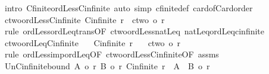 \begin{isabellebody}
\isamarkupfalse%
\ {\isacharparenleft}{\kern0pt}intro\ Cfinite{\isacharunderscore}{\kern0pt}ordLess{\isacharunderscore}{\kern0pt}Cinfinite{\isacharparenright}{\kern0pt}\ {\isacharparenleft}{\kern0pt}auto\ simp{\isacharcolon}{\kern0pt}\ cfinite{\isacharunderscore}{\kern0pt}def\ card{\isacharunderscore}{\kern0pt}of{\isacharunderscore}{\kern0pt}Card{\isacharunderscore}{\kern0pt}order{\isacharparenright}{\kern0pt}%
\endisatagproof
{\isafoldproof}%
%
\isadelimproof
\isanewline
%
\endisadelimproof
\isanewline
{}\isamarkupfalse%
\ ctwo{\isacharunderscore}{\kern0pt}ordLess{\isacharunderscore}{\kern0pt}Cinfinite{\isacharcolon}{\kern0pt}\ {\isachardoublequoteopen}Cinfinite\ r\ {\isasymLongrightarrow}\ ctwo\ {\isacharless}{\kern0pt}o\ r{\isachardoublequoteclose}\isanewline
%
\isadelimproof
%
\endisadelimproof
%
\isatagproof
{}\isamarkupfalse%
\ {\isacharparenleft}{\kern0pt}rule\ ordLess{\isacharunderscore}{\kern0pt}ordLeq{\isacharunderscore}{\kern0pt}trans{\isacharbrackleft}{\kern0pt}OF\ ctwo{\isacharunderscore}{\kern0pt}ordLess{\isacharunderscore}{\kern0pt}natLeq\ natLeq{\isacharunderscore}{\kern0pt}ordLeq{\isacharunderscore}{\kern0pt}cinfinite{\isacharbrackright}{\kern0pt}{\isacharparenright}{\kern0pt}%
\endisatagproof
{\isafoldproof}%
%
\isadelimproof
\isanewline
%
\endisadelimproof
\isanewline
{}\isamarkupfalse%
\ ctwo{\isacharunderscore}{\kern0pt}ordLeq{\isacharunderscore}{\kern0pt}Cinfinite{\isacharcolon}{\kern0pt}\isanewline
\ \ \ {\isachardoublequoteopen}Cinfinite\ r{\isachardoublequoteclose}\isanewline
\ \ \ {\isachardoublequoteopen}ctwo\ {\isasymle}o\ r{\isachardoublequoteclose}\isanewline
%
\isadelimproof
%
\endisadelimproof
%
\isatagproof
{}\isamarkupfalse%
\ {\isacharparenleft}{\kern0pt}rule\ ordLess{\isacharunderscore}{\kern0pt}imp{\isacharunderscore}{\kern0pt}ordLeq{\isacharbrackleft}{\kern0pt}OF\ ctwo{\isacharunderscore}{\kern0pt}ordLess{\isacharunderscore}{\kern0pt}Cinfinite{\isacharbrackleft}{\kern0pt}OF\ assms{\isacharbrackright}{\kern0pt}{\isacharbrackright}{\kern0pt}{\isacharparenright}{\kern0pt}%
\endisatagproof
{\isafoldproof}%
%
\isadelimproof
\isanewline
%
\endisadelimproof
\isanewline
{}\isamarkupfalse%
\ Un{\isacharunderscore}{\kern0pt}Cinfinite{\isacharunderscore}{\kern0pt}bound{\isacharcolon}{\kern0pt}\ {\isachardoublequoteopen}{\isasymlbrakk}{\isacharbar}{\kern0pt}A{\isacharbar}{\kern0pt}\ {\isasymle}o\ r{\isacharsemicolon}{\kern0pt}\ {\isacharbar}{\kern0pt}B{\isacharbar}{\kern0pt}\ {\isasymle}o\ r{\isacharsemicolon}{\kern0pt}\ Cinfinite\ r{\isasymrbrakk}\ {\isasymLongrightarrow}\ {\isacharbar}{\kern0pt}A\ {\isasymunion}\ B{\isacharbar}{\kern0pt}\ {\isasymle}o\ r{\isachardoublequoteclose}\isanewline

\end{isabellebody}
